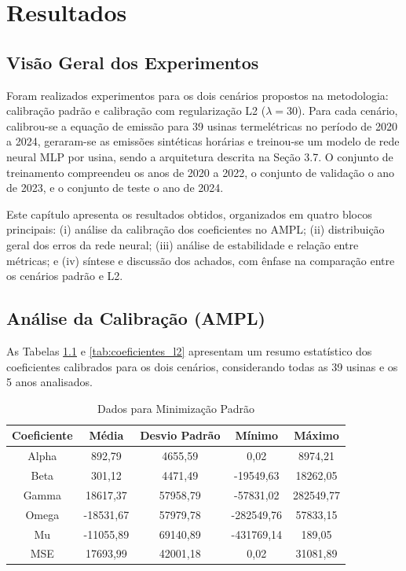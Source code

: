 \chapter{Resultados}\label{chp:res}

\section{Visão Geral dos Experimentos}

Foram realizados experimentos para os dois cenários propostos na metodologia: calibração padrão e calibração com regularização L2 (\(\lambda = 30\)). Para cada cenário, calibrou-se a equação de emissão para 39 usinas termelétricas no período de 2020 a 2024, geraram-se as emissões sintéticas horárias e treinou-se um modelo de rede neural \ac{MLP} por usina, sendo a arquitetura descrita na Seção 3.7. O conjunto de treinamento compreendeu os anos de 2020 a 2022, o conjunto de validação o ano de 2023, e o conjunto de teste o ano de 2024.

Este capítulo apresenta os resultados obtidos, organizados em quatro blocos principais: (i) análise da calibração dos coeficientes no \ac{AMPL}; (ii) distribuição geral dos erros da rede neural; (iii) análise de estabilidade e relação entre métricas; e (iv) síntese e discussão dos achados, com ênfase na comparação entre os cenários padrão e L2.

\section{Análise da Calibração (\ac{AMPL})}

As Tabelas \ref{tab:coeficientes_padrao} e \ref{tab:coeficientes_l2} apresentam um resumo estatístico dos coeficientes calibrados para os dois cenários, considerando todas as 39 usinas e os 5 anos analisados.

\begin{table}[H]
    \centering
    \renewcommand{\arraystretch}{1.5}
    \begin{tabular}{|c|c|c|c|c|}
        \hline
        \textbf{Coeficiente} & \textbf{Média} & \textbf{Desvio Padrão} & \textbf{Mínimo} & \textbf{Máximo} \\
        \hline
        Alpha & 892,79 & 4655,59 & 0,02 & 8974,21 \\
        Beta & 301,12 & 4471,49 & -19549,63 & 18262,05 \\
        Gamma & 18617,37 & 57958,79 & -57831,02 & 282549,77 \\
        Omega & -18531,67 & 57979,78 & -282549,76 & 57833,15 \\
        Mu & -11055,89 & 69140,89 & -431769,14 & 189,05 \\
        \ac{MSE} & 17693,99 & 42001,18 & 0,02 & 31081,89 \\
        \hline
    \end{tabular}
    \caption{Dados para Minimização Padrão}\label{tab:coeficientes_padrao}
\end{table}

